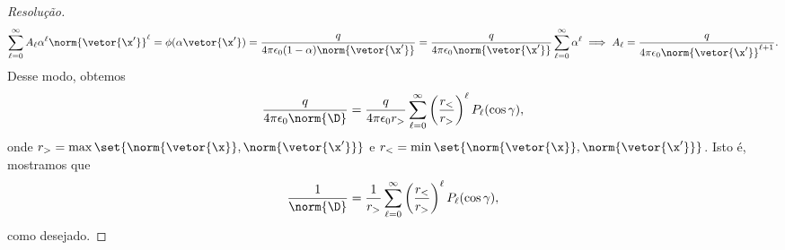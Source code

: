 \begin{proof}[Resolução]
    \begin{equation*}
        \sum_{\ell = 0}^\infty A_\ell \alpha^\ell \norm{\vetor{\x'}}^\ell = \phi(\alpha\vetor{\x'}) =\frac{q}{4\pi \epsilon_0 (1 - \alpha) \norm{\vetor{\x'}}} = \frac{q}{4\pi \epsilon_0 \norm{\vetor{\x'}}}\sum_{\ell = 0}^\infty \alpha^\ell \implies A_\ell = \frac{q}{4\pi \epsilon_0 \norm{\vetor{\x'}}^{\ell + 1}}.
    \end{equation*}
    Desse modo, obtemos
    \begin{equation*}
        \frac{q}{4\pi \epsilon_0 \norm{\D}} = \frac{q}{4\pi \epsilon_0 r_>} \sum_{\ell = 0}^\infty \left(\frac{r_<}{r_>}\right)^\ell P_\ell(\cos \gamma),
    \end{equation*}
    onde \(r_> = \max\set{\norm{\vetor{\x}}, \norm{\vetor{\x'}}}\) e \(r_< = \min\set{\norm{\vetor{\x}}, \norm{\vetor{\x'}}}\). Isto é, mostramos que
    \begin{equation*}
        \frac{1}{\norm{\D}} = \frac{1}{r_>} \sum_{\ell = 0}^\infty \left(\frac{r_<}{r_>}\right)^\ell P_\ell(\cos \gamma),
    \end{equation*}
    como desejado.
\end{proof}
